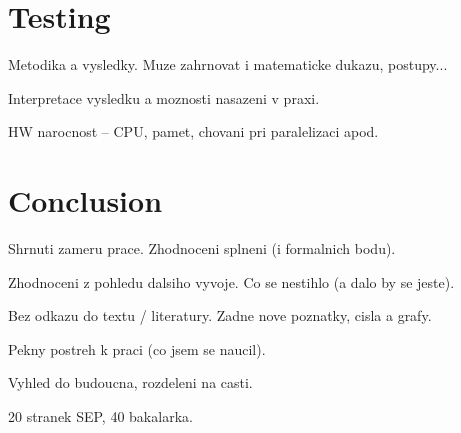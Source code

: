 \chapter{Testing}
Metodika a vysledky. Muze zahrnovat i matematicke dukazu, postupy...

Interpretace vysledku a moznosti nasazeni v praxi.

HW narocnost -- CPU, pamet, chovani pri paralelizaci apod.




\chapter{Conclusion}
Shrnuti zameru prace. Zhodnoceni splneni (i formalnich bodu).

Zhodnoceni z pohledu dalsiho vyvoje. Co se nestihlo (a dalo by se jeste).

Bez odkazu do textu / literatury. Zadne nove poznatky, cisla a grafy.

Pekny postreh k praci (co jsem se naucil).

Vyhled do budoucna, rozdeleni na casti.

20 stranek SEP, 40 bakalarka.




